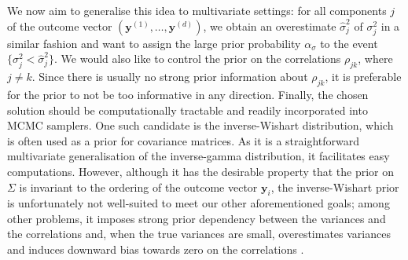 \documentclass[aoas,preprint]{imsart}
\theoremstyle{plain}
\theoremstyle{definition}
\theoremstyle{remark}
\begin{document}
We now aim to generalise this idea to multivariate settings: for all components $j$ of the outcome vector $\left(\mathbf{y}^{(1)},\ldots,\mathbf{y}^{(d)}\right)$, we obtain an overestimate $\hat{\sigma}^2_{j}$ of $\sigma^{2}_{j}$ in a similar fashion and want to assign the large prior probability $\alpha_\sigma$ to the event $\{\sigma^2_j < \hat{\sigma}^2_j\}$. We would also like to control the prior on the correlations $\rho_{jk}$, where $j \neq k$. Since there is usually no strong prior information about $\rho_{jk}$, it is preferable for the prior to not be too informative in any direction. Finally, the chosen solution should be computationally tractable and readily incorporated into MCMC samplers. One such candidate is the inverse-Wishart distribution, which is often used as a prior for covariance matrices. As it is a straightforward multivariate generalisation of the inverse-gamma distribution, it facilitates easy computations. However, although it has the desirable property that the prior on $\Sigma$ is invariant to the ordering of the outcome vector $\mathbf{y}_i$, the inverse-Wishart prior is unfortunately not well-suited to meet our other aforementioned goals; among other problems, it imposes strong prior dependency between the variances and the correlations and, when the true variances are small, overestimates variances and induces downward bias towards zero on the correlations \citep{alvarez2014bayesian}.
    
\end{document}
